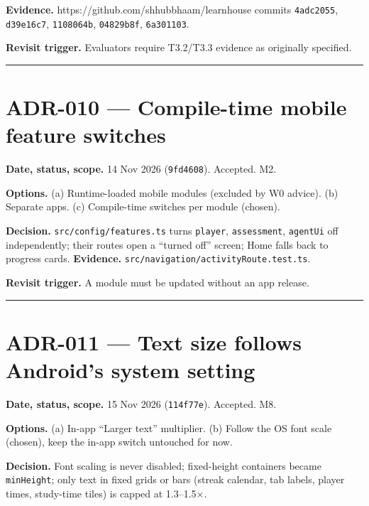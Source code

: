 \documentclass[
  11pt,
]{article}
\begin{document}
\textbf{Evidence.} https://github.com/shhubbhaam/learnhouse commits
\texttt{4adc2055}, \texttt{d39e16c7}, \texttt{1108064b},
\texttt{04829b8f}, \texttt{6a301103}.

\textbf{Revisit trigger.} Evaluators require T3.2/T3.3 evidence as
originally specified.

\begin{center}\rule{0.5\linewidth}{0.5pt}\end{center}

\hypertarget{adr-010-compile-time-mobile-feature-switches}{%
\section{ADR-010 --- Compile-time mobile feature
switches}\label{adr-010-compile-time-mobile-feature-switches}}

\textbf{Date, status, scope.} 14 Nov 2026 (\texttt{9fd4608}). Accepted.
M2.

\textbf{Options.} (a) Runtime-loaded mobile modules (excluded by W0
advice). (b) Separate apps. (c) Compile-time switches per module
(chosen).

\textbf{Decision.} \texttt{src/config/features.ts} turns
\texttt{player}, \texttt{assessment}, \texttt{agentUi} off
independently; their routes open a ``turned off'' screen; Home falls
back to progress cards. \textbf{Evidence.}
\texttt{src/navigation/activityRoute.test.ts}.

\textbf{Revisit trigger.} A module must be updated without an app
release.

\begin{center}\rule{0.5\linewidth}{0.5pt}\end{center}

\hypertarget{adr-011-text-size-follows-androids-system-setting}{%
\section{ADR-011 --- Text size follows Android's system
setting}\label{adr-011-text-size-follows-androids-system-setting}}

\textbf{Date, status, scope.} 15 Nov 2026 (\texttt{114f77e}). Accepted.
M8.

\textbf{Options.} (a) In-app ``Larger text'' multiplier. (b) Follow the
OS font scale (chosen), keep the in-app switch untouched for now.

\textbf{Decision.} Font scaling is never disabled; fixed-height
containers became \texttt{minHeight}; only text in fixed grids or bars
(streak calendar, tab labels, player times, study-time tiles) is capped
at 1.3--1.5×.
\end{document}
